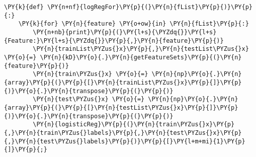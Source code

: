 {\par%
\vspace{-1\baselineskip}%
}%
\begin{notebookcell}[]%
\begin{addmargin}[\cellleftmargin]{0em}%
{\smaller%
\par%
%
\vspace{-1\smallerfontscale}%
\begin{Verbatim}[commandchars=\\\{\}]
\PY{k}{def} \PY{n+nf}{logRegFor}\PY{p}{(}\PY{n}{fList}\PY{p}{)}\PY{p}{:}
    \PY{k}{for} \PY{n}{feature} \PY{o+ow}{in} \PY{n}{fList}\PY{p}{:}
        \PY{n+nb}{print}\PY{p}{(}\PY{l+s}{\PYZdq{}}\PY{l+s}{Feature:}\PY{l+s}{\PYZdq{}}\PY{p}{,}\PY{n}{feature}\PY{p}{)}
        \PY{n}{trainList\PYZus{}x}\PY{p}{,}\PY{n}{testList\PYZus{}x} \PY{o}{=} \PY{n}{kD}\PY{o}{.}\PY{n}{getFeatureSets}\PY{p}{(}\PY{n}{feature}\PY{p}{)}
        \PY{n}{train\PYZus{}x} \PY{o}{=} \PY{n}{np}\PY{o}{.}\PY{n}{array}\PY{p}{(}\PY{p}{[}\PY{n}{trainList\PYZus{}x}\PY{p}{]}\PY{p}{)}\PY{o}{.}\PY{n}{transpose}\PY{p}{(}\PY{p}{)}
        \PY{n}{test\PYZus{}x} \PY{o}{=} \PY{n}{np}\PY{o}{.}\PY{n}{array}\PY{p}{(}\PY{p}{[}\PY{n}{testList\PYZus{}x}\PY{p}{]}\PY{p}{)}\PY{o}{.}\PY{n}{transpose}\PY{p}{(}\PY{p}{)}
        \PY{n}{logisticReg}\PY{p}{(}\PY{n}{train\PYZus{}x}\PY{p}{,}\PY{n}{train\PYZus{}labels}\PY{p}{,}\PY{n}{test\PYZus{}x}\PY{p}{,}\PY{n}{test\PYZus{}labels}\PY{p}{)}\PY{p}{[}\PY{l+m+mi}{1}\PY{p}{]}\PY{p}{;}
\end{Verbatim}
%
\par%
\vspace{-1\smallerfontscale}}%
\end{addmargin}
\end{notebookcell}



